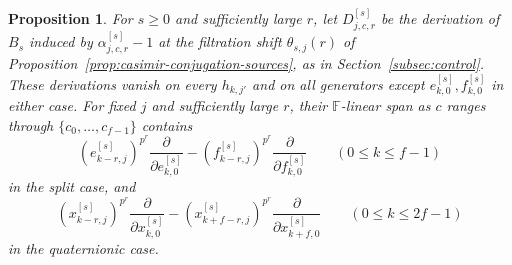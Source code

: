 \documentclass[11pt]{article}
\numberwithin{equation}{section}
\newtheorem{proposition}[theorem]{Proposition}
\theoremstyle{definition}
\theoremstyle{remark}
\newcommand{\F}{\mathbb F}
\begin{document}
\begin{proposition}\label{prop:casimir-source-derivations}
For $s\geq0$ and sufficiently large $r$, let
$D^{[s]}_{j,c,r}$ be the derivation of $B_s$ induced by
$\alpha^{[s]}_{j,c,r}-1$ at the filtration shift $\theta_{s,j}(r)$
of Proposition~\ref{prop:casimir-conjugation-sources}, as in
Section~\ref{subsec:control}.
These derivations vanish on every $h_{k,j'}$ and on all generators
except $e_{k,0}^{[s]},f_{k,0}^{[s]}$ in either case.
For fixed $j$ and sufficiently large $r$, their $\F$-linear span
as $c$ ranges through $\{c_0,\ldots,c_{f-1}\}$ contains
\begin{equation}\label{eq:casimir-split-sources}
 (e_{k-r,j}^{[s]})^{p^r}\frac{\partial}{\partial e_{k,0}^{[s]}}
 -(f_{k-r,j}^{[s]})^{p^r}\frac{\partial}{\partial f_{k,0}^{[s]}}
 \qquad(0\leq k\leq f-1)
\end{equation}
in the split case, and
\begin{equation}\label{eq:casimir-quaternionic-sources}
 (x_{k-r,j}^{[s]})^{p^r}\frac{\partial}{\partial x_{k,0}^{[s]}}
 -(x_{k+f-r,j}^{[s]})^{p^r}
                 \frac{\partial}{\partial x_{k+f,0}^{[s]}}
 \qquad(0\leq k\leq 2f-1)
\end{equation}
in the quaternionic case.
\end{proposition}
\end{document}
